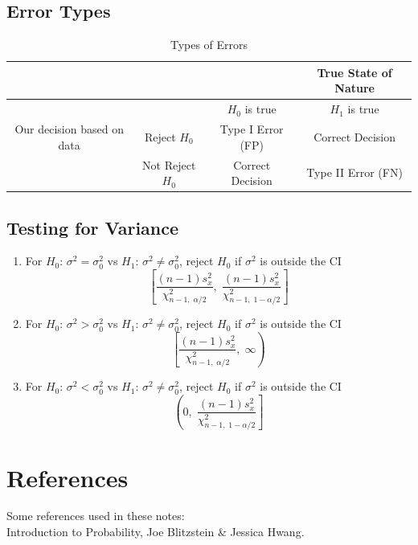 \documentclass{article}
\begin{document}
\subsection{Error Types}

\begin{table}[H]
    \centering
    \begin{tabular}{| c | c | c | c |}
        \hline & & & True State of Nature \\ \hline
        & & $H_{0}$ is true & $H_{1}$ is true \\ \hline  
        Our decision based on data & Reject $H_{0}$ & Type I Error (FP) & Correct Decision \\ \hline 
        & Not Reject $H_{0}$ & Correct Decision & Type II Error (FN) \\ \hline 
    \end{tabular}
    \caption{Types of Errors}
    \label{16-typeoferror}
\end{table}

\subsection{Testing for Variance}
\begin{enumerate}
    \item For $H_{0}$: $\sigma^{2} = \sigma^{2}_0$ vs $H_{1}$: $\sigma^{2} \neq \sigma^{2}_0$, reject $H_{0}$ if $\sigma^{2}$ is outside the CI \begin{equation*}
        \left[ \frac{(n-1)s^{2}_x}{\chi^{2}_{n-1, \; \alpha / 2}}, \;  \frac{(n-1)s^{2}_x}{\chi^{2}_{n-1, \; 1-\alpha / 2}}\right]
    \end{equation*}
    \item For $H_{0}$: $\sigma^{2} > \sigma^{2}_0$ vs $H_{1}$: $\sigma^{2} \neq \sigma^{2}_0$, reject $H_{0}$ if $\sigma^{2}$ is outside the CI \begin{equation*}
        \left[ \frac{(n-1)s^{2}_x}{\chi^{2}_{n-1, \; \alpha / 2}}, \;  \infty\right)
    \end{equation*}
    \item For $H_{0}$: $\sigma^{2} < \sigma^{2}_0$ vs $H_{1}$: $\sigma^{2} \neq \sigma^{2}_0$, reject $H_{0}$ if $\sigma^{2}$ is outside the CI \begin{equation*}
        \left( 0, \;  \frac{(n-1)s^{2}_x}{\chi^{2}_{n-1, \; 1-\alpha / 2}}\right]
    \end{equation*}
\end{enumerate}

\newpage 

\section*{References}

Some references used in these notes: \\ 

Introduction to Probability, Joe Blitzstein \& Jessica Hwang. 
\end{document}
